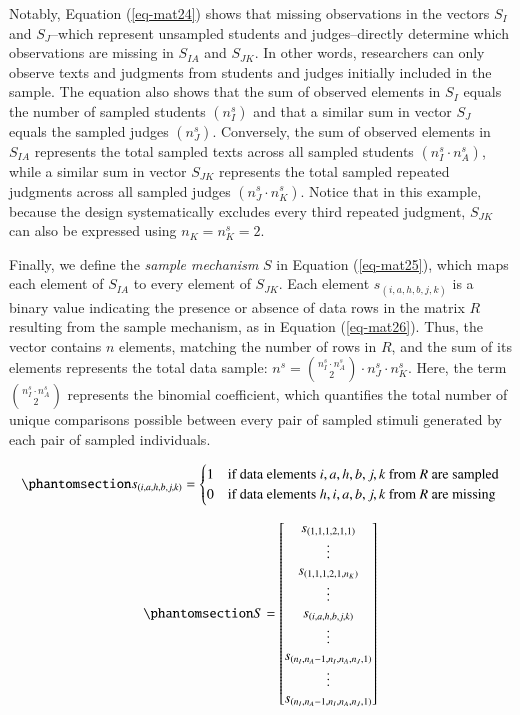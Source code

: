 \documentclass[
  authoryear,
  review,
  1p]{elsarticle}
\begin{document}
Notably, Equation (\ref{eq-mat24}) shows that missing observations in
the vectors \(S_{I}\) and \(S_{J}\)--which represent unsampled students
and judges--directly determine which observations are missing in
\(S_{IA}\) and \(S_{JK}\). In other words, researchers can only observe
texts and judgments from students and judges initially included in the
sample. The equation also shows that the sum of observed elements in
\(S_{I}\) equals the number of sampled students \((n^{s}_{I})\) and that
a similar sum in vector \(S_{J}\) equals the sampled judges
\((n^{s}_{J})\). Conversely, the sum of observed elements in \(S_{IA}\)
represents the total sampled texts across all sampled students
\((n^{s}_{I} \cdot n^{s}_{A})\), while a similar sum in vector
\(S_{JK}\) represents the total sampled repeated judgments across all
sampled judges \((n^{s}_{J} \cdot n^{s}_{K})\). Notice that in this
example, because the design systematically excludes every third repeated
judgment, \(S_{JK}\) can also be expressed using
\(n_{K} = n^{s}_{K} = 2\).

Finally, we define the \emph{sample mechanism} \(S\) in Equation
(\ref{eq-mat25}), which maps each element of \(S_{IA}\) to every element
of \(S_{JK}\). Each element \(s_{(i,a,h,b,j,k)}\) is a binary value
indicating the presence or absence of data rows in the matrix \(R\)
resulting from the sample mechanism, as in Equation (\ref{eq-mat26}).
Thus, the vector contains \(n\) elements, matching the number of rows in
\(R\), and the sum of its elements represents the total data sample:
\(n^{s} = \binom{n^{s}_{I} \cdot n^{s}_{A}}{2} \cdot n^{s}_{J} \cdot n^{s}_{K}\).
Here, the term \({n^{s}_{I} \cdot n^{s}_{A} \choose 2}\) represents the
binomial coefficient, which quantifies the total number of unique
comparisons possible between every pair of sampled stimuli generated by
each pair of sampled individuals.

\begin{equation}\phantomsection\label{eq-mat26}{
s_{(i,a,h,b,j,k)} = \begin{cases} 
1 & \text{if data elements } i,a,h,b,j,k \text{ from } R \text{ are sampled} \\
0 & \text{if data elements } h,i,a,b,j,k \text{ from } R \text{ are missing}
\end{cases}
}\end{equation}

\begin{equation}\phantomsection\label{eq-mat25}{
S = \begin{bmatrix}
s_{(1,1,1,2,1,1)} \\
\vdots \\
s_{(1,1,1,2,1,n_{K})} \\
\vdots \\
s_{(i,a,h,b,j,k)} \\
\vdots \\
s_{(n_{I},n_{A}-1,n_{I},n_{A},n_{J},1)} \\
\vdots \\
s_{(n_{I},n_{A}-1,n_{I},n_{A},n_{J},1)}
\end{bmatrix}
}\end{equation}
\end{document}
